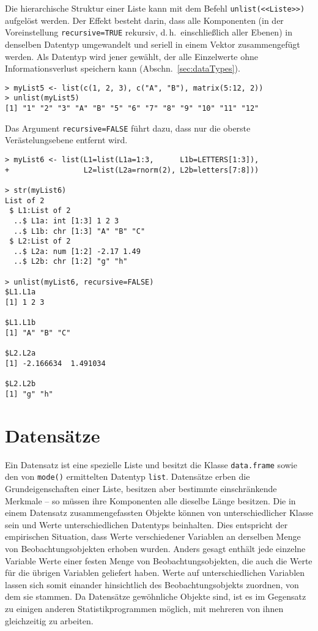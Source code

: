 Die hierarchische Struktur einer Liste kann mit dem Befehl \lstinline!unlist(<<Liste>>)! aufgelöst werden. Der Effekt besteht darin, dass alle Komponenten (in der Voreinstellung \lstinline!recursive=TRUE! rekursiv, d.\,h.\ einschließlich aller Ebenen) in denselben Datentyp umgewandelt und seriell in einem Vektor zusammengefügt werden. Als Datentyp wird jener gewählt, der alle Einzelwerte ohne Informationsverlust speichern kann (Abschn.\ \ref{sec:dataTypes}).
\begin{lstlisting}
> myList5 <- list(c(1, 2, 3), c("A", "B"), matrix(5:12, 2))
> unlist(myList5)
[1] "1" "2" "3" "A" "B" "5" "6" "7" "8" "9" "10" "11" "12"
\end{lstlisting}

Das Argument \lstinline!recursive=FALSE! führt dazu, dass nur die oberste Verästelungsebene entfernt wird.
\begin{lstlisting}
> myList6 <- list(L1=list(L1a=1:3,      L1b=LETTERS[1:3]),
+                 L2=list(L2a=rnorm(2), L2b=letters[7:8]))

> str(myList6)
List of 2
 $ L1:List of 2
  ..$ L1a: int [1:3] 1 2 3
  ..$ L1b: chr [1:3] "A" "B" "C"
 $ L2:List of 2
  ..$ L2a: num [1:2] -2.17 1.49
  ..$ L2b: chr [1:2] "g" "h"

> unlist(myList6, recursive=FALSE)
$L1.L1a
[1] 1 2 3

$L1.L1b
[1] "A" "B" "C"

$L2.L2a
[1] -2.166634  1.491034

$L2.L2b
[1] "g" "h"
\end{lstlisting}

\section{Datensätze}
\label{sec:dataframe}


Ein Datensatz ist eine spezielle Liste und besitzt die Klasse \lstinline!data.frame! sowie den von \lstinline!mode()! ermittelten Datentyp \lstinline!list!. Datensätze erben die Grundeigenschaften einer Liste, besitzen aber bestimmte einschränkende Merkmale -- so müssen ihre Komponenten alle dieselbe Länge besitzen. Die in einem Datensatz zusammengefassten Objekte können von unterschiedlicher Klasse sein und Werte unterschiedlichen Datentyps beinhalten. Dies entspricht der empirischen Situation, dass Werte verschiedener Variablen an derselben Menge von Beobachtungsobjekten erhoben wurden. Anders gesagt enthält jede einzelne Variable Werte einer festen Menge von Beobachtungsobjekten, die auch die Werte für die übrigen Variablen geliefert haben. Werte auf unterschiedlichen Variablen lassen sich somit einander hinsichtlich des Beobachtungsobjekts zuordnen, von dem sie stammen. Da Datensätze gewöhnliche Objekte sind, ist es im Gegensatz zu einigen anderen Statistikprogrammen möglich, mit mehreren von ihnen gleichzeitig zu arbeiten.

